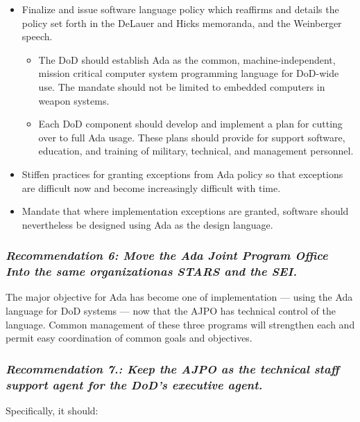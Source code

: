 \documentclass[12pt,final]{article}
\begin{document}
\begin{itemize}
    \item Finalize and issue software language policy which reaffirms and
        details the policy set forth in the DeLauer and Hicks memoranda, and
        the Weinberger speech.
\begin{itemize}
    \item The DoD should establish Ada as the common, machine-independent,
        mission critical computer system programming language for DoD-wide use.
        The mandate should not be limited to embedded computers in weapon
        systems.
    \item Each DoD component should develop and implement a plan for cutting
        over to full Ada usage. These plans should provide for support
        software, education, and training of military, technical, and
        management personnel.
\end{itemize}
    \item Stiffen practices for granting exceptions from Ada policy so that
        exceptions are difficult now and become increasingly difficult with
        time.
    \item Mandate that where implementation exceptions are granted, software
        should nevertheless be designed using Ada as the design language.
\end{itemize}

\subsubsection*{\textit{Recommendation 6: Move the Ada Joint Program Office
Into the same organizationas STARS and the SEI.}}

The major objective for Ada has become one of implementation — using the Ada
language for DoD systems — now that the AJPO has technical control of the
language. Common management of these three programs will strengthen each and
permit easy coordination of common goals and objectives.

\subsubsection*{\textit{Recommendation 7.: Keep the AJPO as the technical staff support agent
for the DoD’s executive agent.}}

Specifically, it should:
\end{document}
